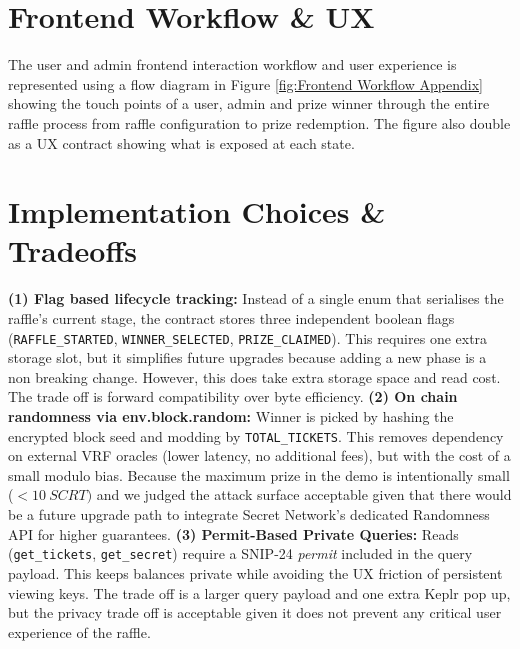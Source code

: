 \documentclass{article}
\begin{document}
\section{Frontend Workflow \& UX}
The user and admin frontend interaction workflow and user experience is represented using a flow diagram in Figure \ref{fig:Frontend Workflow Appendix} showing the touch points of a user, admin and prize winner through the entire raffle process from raffle configuration to prize redemption. The figure also double as a UX contract showing what is exposed at each state.

\section{Implementation Choices \& Tradeoffs}

\textbf{(1) Flag based lifecycle tracking:} Instead of a single enum that serialises the raffle's current stage, the contract stores three independent boolean flags (\texttt{RAFFLE\_STARTED}, \texttt{WINNER\_SELECTED}, \texttt{PRIZE\_CLAIMED}). This requires one extra storage slot, but it simplifies future upgrades because adding a new phase is a non breaking change. However, this does take extra storage space and read cost. The trade off is forward compatibility over byte efficiency. \textbf{(2) On chain randomness via env.block.random:} Winner is picked by hashing the encrypted block seed and modding by \texttt{TOTAL\_TICKETS}. This removes dependency on external VRF oracles (lower latency, no additional fees), but with the cost of a small modulo bias. Because the maximum prize in the demo is intentionally small (\(<10~SCRT)\) and we judged the attack surface acceptable given that there would be a future upgrade path to integrate Secret Network's dedicated Randomness API for higher guarantees. \textbf{(3) Permit-Based Private Queries:} Reads (\texttt{get\_tickets}, \texttt{get\_secret}) require a SNIP-24 \emph{permit} included in the query payload. This keeps balances private while avoiding the UX friction of persistent viewing keys. The trade off is a larger query payload and one extra Keplr pop up, but the privacy trade off is acceptable given it does not prevent any critical user experience of the raffle.
\end{document}
